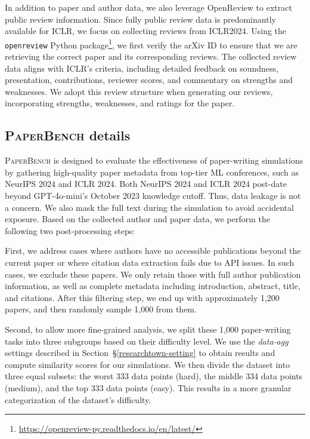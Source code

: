  In addition to paper and author data, we also leverage OpenReview to extract public review information. Since fully public review data is predominantly available for ICLR, we focus on collecting reviews from ICLR2024. Using the \texttt{openreview} Python package\footnote{\url{https://openreview-py.readthedocs.io/en/latest/}}, we first verify the arXiv ID to ensure that we are retrieving the correct paper and its corresponding reviews. The collected review data aligns with ICLR’s criteria, including detailed feedback on soundness, presentation, contributions, reviewer scores, and commentary on strengths and weaknesses. We adopt this review structure when generating our reviews, incorporating strengths, weaknesses, and ratings for the paper.


\subsection{\textsc{PaperBench} details}
\label{paper-bench-detail}
\textsc{PaperBench} is designed to evaluate the effectiveness of paper-writing simulations by gathering high-quality paper metadata from top-tier ML conferences, such as NeurIPS 2024 and ICLR 2024. Both NeurIPS 2024 and ICLR 2024 post-date beyond GPT-4o-mini's October 2023 knowledge cutoff. Thus, data leakage is not a concern. We also mask the full text during the simulation to avoid accidental exposure. Based on the collected author and paper data, we perform the following two post-processing steps:

First, we address cases where authors have no accessible publications beyond the current paper or where citation data extraction fails due to API issues. In such cases, we exclude these papers. We only retain those with full author publication information, as well as complete metadata including introduction, abstract, title, and citations. After this filtering step, we end up with approximately 1,200 papers, and then randomly sample 1,000 from them.

Second, to allow more fine-grained analysis, we split these 1,000 paper-writing tasks into three subgroups based on their difficulty level. We use the \textit{data-agg} settings described in Section~\S\ref{researchtown-setting} to obtain results and compute similarity scores for our simulations. We then divide the dataset into three equal subsets: the worst 333 data points (hard), the middle 334 data points (medium), and the top 333 data points (easy). This results in a more granular categorization of the dataset’s difficulty.


